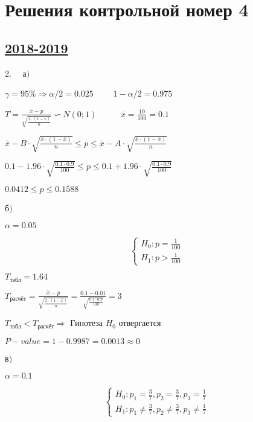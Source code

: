 \thispagestyle{empty}
\section{Решения контрольной номер 4}

\subsection[2018-2019]{\hyperref[sec:kr_04_2018_2019]{2018-2019}}
\label{sec:sol_kr_04_2018_2019}

\begin{enumerate} 
	2. \ \ а$)$
	\par\bigskip
	$\gamma = 95\% \Rightarrow \alpha / 2 = 0.025$ \ \ \ \ $1 - \alpha / 2 = 0.975$ 
	\par\bigskip
	$T=\frac{\bar x - p}{\sqrt{\frac{\bar x \cdot (1 - \bar x) }{n}}}\backsim N(0;1)$ \ \ \ \ \ $\bar x = \frac{10}{100} = 0.1$
	\par\bigskip
	$\bar x - B \cdot \sqrt{\frac{\bar x \cdot (1 - \bar x) }{n}} \le p \le \bar x - A \cdot \sqrt{\frac{\bar x \cdot (1 - \bar x) }{n}}$
	\par\bigskip
	$0.1 - 1.96 \cdot \sqrt{\frac{0.1 \cdot 0.9}{100}} \le p \le 0.1 + 1.96 \cdot \sqrt{\frac{0.1 \cdot 0.9}{100}}$
	\par\bigskip
	$0.0412 \le p \le 0.1588$
	\par\bigskip
	б$)$
	
	$\alpha = 0.05$
	
	\[
	\left\{
	\begin{array}{ll}
	H_0: p = \frac{1}{100} \\
	H_1: p > \frac{1}{100}
	\end{array}
	\right.
	\]
	
	$T_{\mbox{табл}} = 1.64$
	\par\bigskip
	$T_{\mbox{расчёт}} = \frac{\bar x - p}{\sqrt{\frac{\bar x \cdot (1 - \bar x) }{n}}} = \frac{0.1 - 0.01}{\sqrt{\frac{0.1 \cdot 0.9}{100}}} = 3$ 
	\par\bigskip
	$T_{\mbox{табл}} < T_{\mbox{расчёт}} \Rightarrow$ Гипотеза $H_0$ отвергается 
	\par\bigskip
	$P-value = 1 - 0.9987 = 0.0013 \approx 0$
	\par\bigskip
	в$)$
	
	$\alpha = 0.1$
	
	\[
	\left\{
	\begin{array}{ll}
	H_0: p_1 = \frac{3}{7}, p_2 = \frac{3}{7}, p_3 = \frac{1}{7} \\
	H_1: p_1 \neq \frac{3}{7}, p_2 \neq \frac{3}{7}, p_3 \neq \frac{1}{7} 
	\end{array}
	\right.
	\]
	

\end{enumerate}
